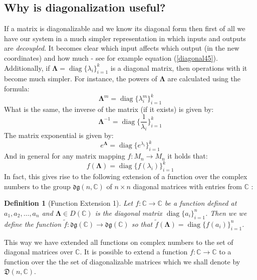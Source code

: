 \documentclass[a4paper,10pt,oneside]{book}
\newtheorem{definition}{Definition}
\begin{document}
\subsection{Why is diagonalization useful?}\label{sec:diagonalizationUsefulness}
If a matrix is diagonalizable and we know its diagonal form then first of all 
we have our system in a much simpler representation in which inputs and outputs
are \emph{decoupled}. It becomes clear which input affects which output (in the new
coordinates) and how much - see for example equation (\ref{diagonal45}).
Additionally, if $\mathbf{\Lambda}=\operatorname{diag}\{\lambda_i\}_{i=1}^k$ is a diagonal matrix, then operations
with it become much simpler. For instance, the powers of $\mathbf{\Lambda}$ are calculated using
the formula:
\begin{equation}
 \mathbf{\Lambda}^m=\operatorname{diag}\{\lambda_i^m\}_{i=1}^k
\end{equation}
What is the same, the inverse of the matrix (if it exists) is given by:
\begin{equation}
 \mathbf{\Lambda}^{-1}=\operatorname{diag}\{\frac{1}{\lambda_i}\}_{i=1}^k
\end{equation}
The matrix exponential is given by:
\begin{equation}
 e^{\mathbf{\Lambda}}=\operatorname{diag}\{e^{\lambda_i}\}_{i=1}^k
\end{equation}
And in general for any matrix mapping $f:M_n\rightarrow M_n$ it holds that:
\begin{equation}
 f(\mathbf{\Lambda})=\operatorname{diag}\{f(\lambda_i)\}_{i=1}^k
\end{equation}
In fact, this gives rise to the following extension of a function over the complex numbers to the group $\mathfrak{dg}(n,\mathbb{C})$ of $n\times n$ diagonal matrices with entries from $\mathbb{C}$ \cite[Chapter 4]{Spr00}:
\begin{definition}[Function Extension 1]
 Let $f:\mathbb{C}\to\mathbb{C}$ be a function defined at $a_1,a_2,\ldots,a_n$ and $\mathbf{\Lambda}\in D(\mathbb{C})$ is the diagonal matrix $\operatorname{diag}\{a_i\}_{i=1}^n$. Then we we define the function $\tilde{f}:\mathfrak{dg}(\mathbb{C})\to \mathfrak{dg}(\mathbb{C})$ so that $\tilde{f}(\mathbf{\Lambda})=\operatorname{diag}\{f(a_i)\}_{i=1}^n$.
\end{definition}
\noindent This way we have extended all functions on complex numbers to the set of diagonal matrices over $\mathbb{C}$. It is possible to extend a function $f:\mathbb{C}\to \mathbb{C}$ to a function over the the set of diagonalizable matrices which we shall denote by $\mathfrak{D}(n,\mathbb{C})$.
\end{document}
